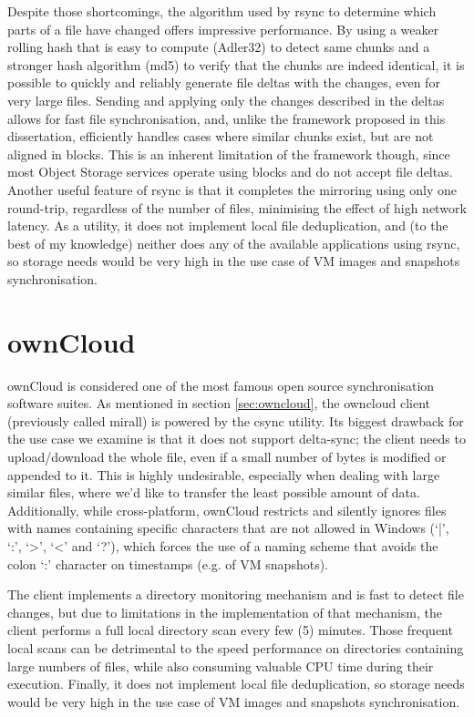   Despite those shortcomings, the algorithm used by rsync to determine which parts of a file have changed offers impressive performance. By using a weaker rolling hash that is easy to compute (Adler32) to detect same chunks and a stronger hash algorithm (md5) to verify that the chunks are indeed identical, it is possible to quickly and reliably generate file deltas with the changes, even for very large files. Sending and applying only the changes described in the deltas allows for fast file synchronisation, and, unlike the framework proposed in this dissertation, efficiently handles cases where similar chunks exist, but are not aligned in blocks. This is an inherent limitation of the framework though, since most Object Storage services operate using blocks and do not accept file deltas. Another useful feature of rsync is that it completes the mirroring using only one round-trip, regardless of the number of files, minimising the effect of high network latency. As a utility, it does not implement local file deduplication, and (to the best of my knowledge) neither does any of the available applications using rsync, so storage needs would be very high in the use case of VM images and snapshots synchronisation.

\section{ownCloud}
  ownCloud is considered one of the most famous open source synchronisation software suites. As mentioned in section \ref{sec:owncloud}, the owncloud client (previously called mirall) is powered by the csync utility. Its biggest drawback for the use case we examine is that it does not support delta-sync; the client needs to upload/download the whole file, even if a small number of bytes is modified or appended to it. This is highly undesirable, especially when dealing with large similar files, where we'd like to transfer the least possible amount of data. Additionally, while cross-platform, ownCloud restricts and silently ignores files with names containing specific characters that are not allowed in Windows (`|', `:', `>', `<' and `?'), which forces the use of a naming scheme that avoids the colon `:' character on timestamps (e.g. of VM snapshots).

  The client implements a directory monitoring mechanism and is fast to detect file changes, but due to limitations in the implementation of that mechanism, the client performs a full local directory scan every few (5) minutes. Those frequent local scans can be detrimental to the speed performance on directories containing large numbers of files, while also consuming valuable CPU time during their execution. Finally, it does not implement local file deduplication, so storage needs would be very high in the use case of VM images and snapshots synchronisation.

